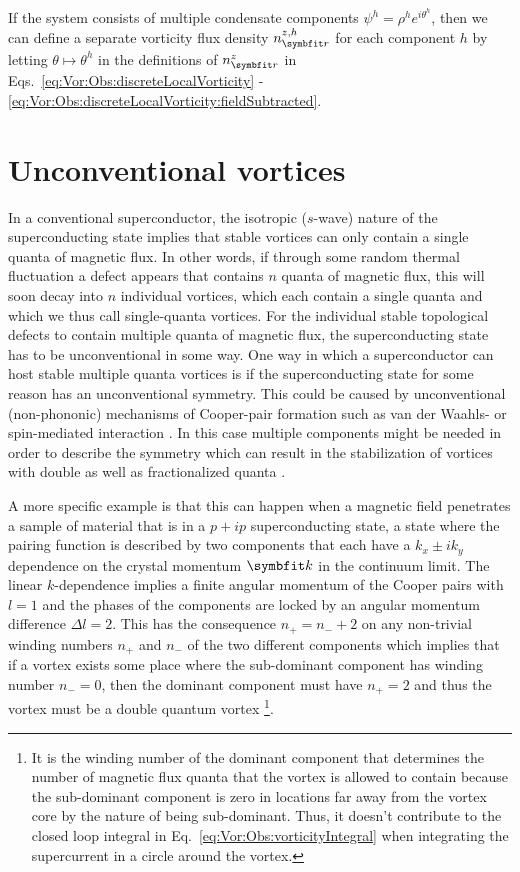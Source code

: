 If the system consists of multiple condensate components $\psi^h = \rho^he^{i\theta^h}$, then we can define a separate vorticity flux density $n^{z,h}_\v{r}$ for each component
$h$ by letting $\theta\mapsto\theta^h$ in the definitions of $n^z_\v{r}$ in Eqs.~\eqref{eq:Vor:Obs:discreteLocalVorticity} - \eqref{eq:Vor:Obs:discreteLocalVorticity:fieldSubtracted}.


\section{Unconventional vortices}
\label{sec:Vor:UnconventionalVortices}

In a conventional superconductor, the isotropic (\ie $s$-wave) nature of the superconducting state implies that stable vortices can only contain a single quanta of magnetic flux.
In other words, if through some random thermal fluctuation a defect appears that contains $n$ quanta of magnetic flux, this will soon decay into $n$ individual vortices,
which each contain a single quanta and which we thus call single-quanta vortices.
For the individual stable topological defects to contain
multiple quanta of magnetic flux, the superconducting state has to be unconventional in some way.
One way in which a superconductor can host stable multiple quanta vortices is if the superconducting state for some reason has an unconventional symmetry. This could \eg be
caused by unconventional (\ie non-phononic) mechanisms of Cooper-pair formation such as van der Waahls- or spin-mediated interaction \cite{Sigrist05}.
In this case multiple components might be needed in order to describe the symmetry which can result in the stabilization of vortices with double as well as fractionalized
quanta \cite{Babaev02}.

A more specific example is that this can happen when a magnetic field penetrates a sample of material that is in a $p+ip$ superconducting state, \ie a state where the
pairing function is described by two components that each have a $k_x\pm ik_y$ dependence on the crystal momentum $\v{k}$ in the continuum limit. The linear
$k$-dependence implies a finite angular momentum of the Cooper pairs with $l=1$ and the phases of the components are locked by an angular momentum difference $\Delta l=2$.
This has the consequence $n_+ = n_- + 2$ on any non-trivial winding numbers $n_+$ and $n_-$ of the two different components which implies that if a vortex exists some
place where the sub-dominant component has winding number $n_-=0$, then the dominant component must have $n_+=2$ and thus the vortex must be a double quantum vortex%
\footnote{It is the winding number of the dominant component that determines the number of magnetic flux quanta that the vortex is allowed to contain because the sub-dominant
component is zero in locations far away from the vortex core by the nature of being sub-dominant. Thus, it doesn't contribute to the closed loop integral in 
Eq.~\eqref{eq:Vor:Obs:vorticityIntegral} when integrating the supercurrent in a circle around the vortex.}.

